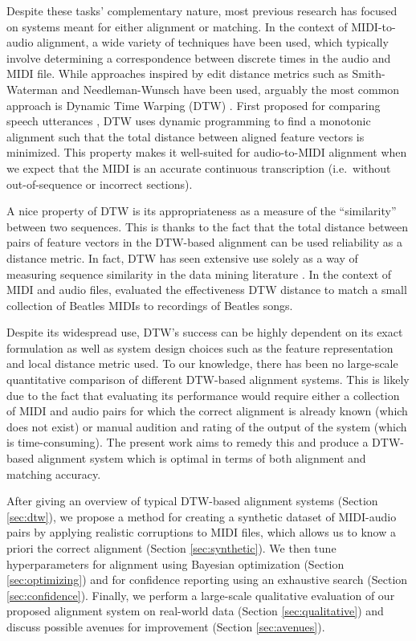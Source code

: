 \documentclass{article}
\begin{document}
Despite these tasks' complementary nature, most previous research has focused on systems meant for either alignment or matching.
In the context of MIDI-to-audio alignment, a wide variety of techniques have been used, which typically involve determining a correspondence between discrete times in the audio and MIDI file.
While approaches inspired by edit distance metrics such as Smith-Waterman \cite{ewert2012towards} and Needleman-Wunsch \cite{grachten2013automatic} have been used, arguably the most common approach is Dynamic Time Warping (DTW) \cite{muller2007dynamic}.
First proposed for comparing speech utterances \cite{sakoe1978dynamic}, DTW uses dynamic programming to find a monotonic alignment such that the total distance between aligned feature vectors is minimized.
This property makes it well-suited for audio-to-MIDI alignment when we expect that the MIDI is an accurate continuous transcription (i.e.\ without out-of-sequence or incorrect sections).

A nice property of DTW is its appropriateness as a measure of the ``similarity'' between two sequences.
This is thanks to the fact that the total distance between pairs of feature vectors in the DTW-based alignment can be used reliability as a distance metric.
In fact, DTW has seen extensive use solely as a way of measuring sequence similarity in the data mining literature \cite{berndt1994using}.
In the context of MIDI and audio files, \cite{hu2003polyphonic} evaluated the effectiveness DTW distance to match a small collection of Beatles MIDIs to recordings of Beatles songs.

Despite its widespread use, DTW's success can be highly dependent on its exact formulation as well as system design choices such as the feature representation and local distance metric used.
To our knowledge, there has been no large-scale quantitative comparison of different DTW-based alignment systems.
This is likely due to the fact that evaluating its performance would require either a collection of MIDI and audio pairs for which the correct alignment is already known (which does not exist) or manual audition and rating of the output of the system (which is time-consuming).
The present work aims to remedy this and produce a DTW-based alignment system which is optimal in terms of both alignment and matching accuracy.

After giving an overview of typical DTW-based alignment systems (Section \ref{sec:dtw}), we propose a method for creating a synthetic dataset of MIDI-audio pairs by applying realistic corruptions to MIDI files, which allows us to know a priori the correct alignment (Section \ref{sec:synthetic}).
We then tune hyperparameters for alignment using Bayesian optimization (Section \ref{sec:optimizing}) and for confidence reporting using an exhaustive search (Section \ref{sec:confidence}).
Finally, we perform a large-scale qualitative evaluation of our proposed alignment system on real-world data (Section \ref{sec:qualitative}) and discuss possible avenues for improvement (Section \ref{sec:avenues}).
\end{document}
